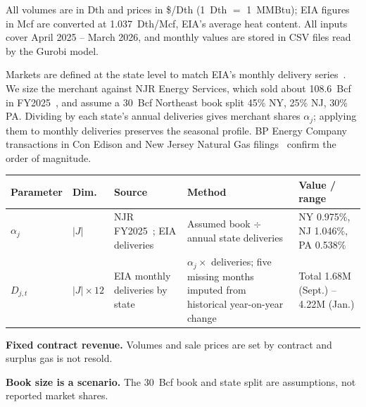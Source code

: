 \documentclass[11pt]{article}
\makeatletter
\newcommand{\head}[1]{\needspace{5\baselineskip}\vspace{0.5em}\noindent{\large\bfseries\color{navy}\uline{#1}}\par\vspace{0.15em}}
\newcommand{\subhead}[1]{\vspace{0.4em}\noindent{\bfseries\color{navy}#1}\par\vspace{0.1em}}
\newenvironment{ptable}
  {\par\smallskip\noindent\small
   \begin{tabular}{@{}p{1.9cm} p{1.2cm} p{3.6cm} p{4.5cm} p{3.7cm}@{}}
   \hline
   \textbf{Parameter} & \textbf{Dim.} & \textbf{Source} & \textbf{Method} & \textbf{Value / range} \\
   \hline}
  {\hline\end{tabular}\par\smallskip}
\makeatother
\begin{document}
\head{Parameter Estimation}
All volumes are in Dth and prices in \$/Dth (1~Dth $=$ 1~MMBtu); EIA figures in Mcf are converted at
1.037~Dth/Mcf, EIA's average heat content. All inputs cover April 2025 -- March 2026, and monthly
values are stored in CSV files read by the Gurobi model.

\subhead{Demand}
Markets are defined at the state level to match EIA's monthly delivery series~\cite{eia}. We size the
merchant against NJR Energy Services, which sold about 108.6~Bcf in FY2025~\cite{njr}, and assume a
30~Bcf Northeast book split 45\% NY, 25\% NJ, 30\% PA. Dividing by each state's annual deliveries gives
merchant shares $\alpha_j$; applying them to monthly deliveries preserves the seasonal profile.
BP Energy Company transactions in Con Edison and New Jersey Natural Gas filings~\cite{utility}
confirm the order of magnitude.
\begin{ptable}
$\alpha_j$  & $|J|$ & NJR FY2025~\cite{njr}; EIA deliveries~\cite{eia} & Assumed book $\div$ annual state deliveries & NY 0.975\%, NJ 1.046\%, PA 0.538\% \\
$D_{j,t}$   & $|J|\times 12$ & EIA monthly deliveries by state~\cite{eia} & $\alpha_j \times$ deliveries; five missing months imputed from historical year-on-year change & Total 1.68M (Sept.) -- 4.22M (Jan.) \\
\end{ptable}
\vspace{-0.3\baselineskip}
\begin{assume}[series=assumptions]
  \item \label{a:revenue}\textbf{Fixed contract revenue.} Volumes and sale prices are set by contract
        and surplus gas is not resold.
  \item \textbf{Book size is a scenario.} The 30~Bcf book and state split are assumptions, not
        reported market shares.
\end{assume}
\end{document}
